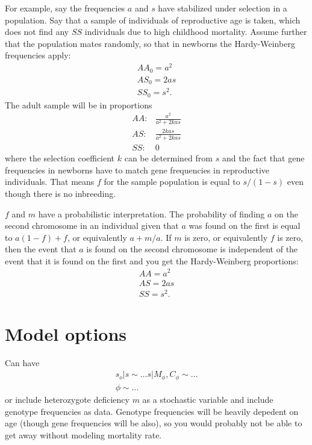 \documentclass[a4paper]{article}
\begin{document}
For example, say the frequencies $a$ and $s$ have stabilized under selection in a population. Say that a sample of individuals of reproductive age is taken, which does not find any $SS$ individuals due to high childhood mortality. Assume further that the population mates randomly, so that in newborns the Hardy-Weinberg frequencies apply:
\begin{eqnarray*}
    AA_0 = a^2\\
    AS_0 = 2as\\
    SS_0 = s^2.
\end{eqnarray*}
The adult sample will be in proportions 
\begin{eqnarray*}
    AA:&\frac{a^2}{a^2+2kas}\\
    AS:&\frac{2kas}{a^2+2kas}\\
    SS:&0
\end{eqnarray*}
where the selection coefficient $k$ can be determined from $s$ and the fact that gene frequencies in newborns have to match gene frequencies in reproductive individuals. That means $f$ for the sample population is equal to $s/(1-s)$ even though there is no inbreeding.

\bigskip
$f$ and $m$ have a probabilistic interpretation. The probability of finding $a$ on the second chromosome in an individual given that $a$ was found on the first is equal to $a(1-f)+f$, or equivalently $a+m/a$. If $m$ is zero, or equivalently $f$ is zero, then the event that $a$ is found on the second chromosome is independent of the event that it is found on the first and you get the Hardy-Weinberg proportions:
\begin{eqnarray*}
    AA=a^2\\
    AS=2as\\
    SS=s^2.
\end{eqnarray*}

\section{Model options} %
\label{sec:model_options}

Can have
\begin{eqnarray*}
    s_o|s\sim\ldots
    s|M_\phi,C_\phi\sim\ldots\\
    \phi\sim\ldots
\end{eqnarray*}
or include heterozygote deficiency $m$ as a stochastic variable and include genotype frequencies as data. Genotype frequencies will be heavily depedent on age (though gene frequencies will be also), so you would probably not be able to get away without modeling mortality rate.

\end{document}
